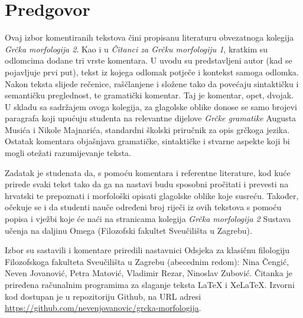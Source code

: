 \documentclass[a4paper,12pt,twoside]{report}
\renewcommand{\chaptermark}[1]{\markboth{#1}{}}
\newcommand{\subtitle}[1]{%
  \posttitle{%
    \par\end{center}
    \begin{center}\large#1\end{center}
    \vskip0.5em}%
}
\begin{document}

\clearpage

\tableofcontents





\chapter*{Predgovor}
\label{chap:predgovor}
\chaptermark{Predgovor}

Ovaj izbor komentiranih tekstova čini propisanu literaturu obvezatnoga kolegija \textit{Grčka morfologija 2}. Kao i u \textit{Čitanci za Grčku morfologiju 1}, kratkim su odlomcima dodane tri vrste komentara. U uvodu su predstavljeni autor (kad se pojavljuje prvi put), tekst iz kojega odlomak potječe i kontekst samoga odlomka. Nakon teksta slijede rečenice, raščlanjene i složene tako da povećaju sintaktičku i semantičku preglednost, te gramatički komentar. Taj je komentar, opet, dvojak. U skladu sa sadržajem ovoga kolegija, za glagolske oblike donose se samo brojevi paragrafa koji upućuju studenta na relevantne dijelove \textit{Grčke gramatike} Augusta Musića i Nikole Majnarića, standardni školski priručnik za opis grčkoga jezika. Ostatak komentara objašnjava gramatičke, sintaktičke i stvarne aspekte koji bi mogli otežati razumijevanje teksta.

Zadatak je studenata da, s pomoću komentara i referentne literature, kod kuće prirede svaki tekst tako da ga na nastavi budu sposobni pročitati i prevesti na hrvatski te prepoznati i morfološki opisati glagolske oblike koje susreću. Također, očekuje se i da studenti nauče određeni broj riječi iz ovih tekstova s pomoću popisa i vježbi koje će naći na stranicama kolegija \textit{Grčka morfologija 2} Sustava učenja na daljinu Omega (Filozofski fakultet Sveučilišta u Zagrebu).


Izbor su sastavili i komentare priredili nastavnici Odsjeka za klasičnu filologiju Filozofskoga fakulteta Sveučilišta u Zagrebu (abecednim redom): Nina Čengić, Neven Jovanović, Petra Matović, Vladimir Rezar, Ninoslav Zubović. Čitanka je priređena računalnim programima za slaganje teksta LaTeX i XeLaTeX. Izvorni kod dostupan je u repozitoriju Github, na URL adresi \url{https://github.com/nevenjovanovic/grcka-morfologija}.
\end{document}
